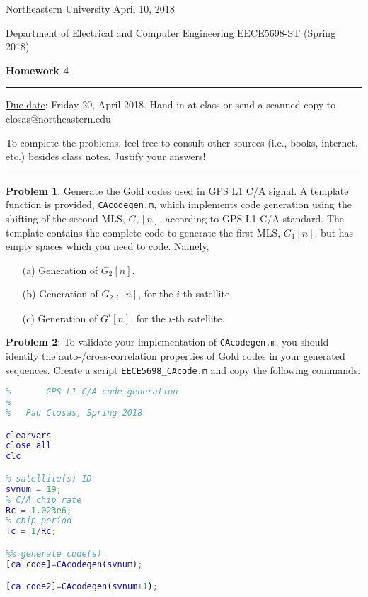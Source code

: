 \documentclass[11pt]{article}
\begin{document}
\noindent Northeastern University
\hfill April 10, 2018

\noindent Department of Electrical and Computer Engineering
\hfill EECE5698-ST (Spring 2018)

\noindent {} \hfill \textbf{Homework 4}

\noindent \rule{\linewidth}{1.5pt}

\vspace*{.5cm}

\underline{Due date}: Friday 20, April 2018. Hand in at class or send a scanned copy to closas@northeastern.edu

To complete the problems, feel free to consult other sources (i.e., books, internet, etc.) besides class notes.  Justify your answers!

\noindent \rule{\linewidth}{1pt}
\vspace*{1cm}


\textbf{Problem 1}:
Generate the Gold codes used in GPS L1 C/A signal. A template function is provided, \verb|CAcodegen.m|, which implements code generation using the shifting of the second MLS, $G_2[n]$, according to GPS L1 C/A standard.
The template contains the complete code to generate the first MLS, $G_1[n]$, but has empty spaces which you need to code. Namely,
\begin{enumerate}
\item[(a)] Generation of $G_2[n]$.
\item[(b)] Generation of $G_{2,i}[n]$, for the $i$-th satellite.
\item[(c)] Generation of $G^{i}[n]$, for the $i$-th satellite.
\end{enumerate}


\vspace*{.5cm}

\textbf{Problem 2}:
To validate your implementation of \verb|CAcodegen.m|, you should identify the auto-/cross-correlation properties of Gold codes in your generated sequences. 
Create a script \verb|EECE5698_CAcode.m| and copy the following commands:

\begin{lstlisting}[language=Matlab,basicstyle=\scriptsize,keywordstyle=\color{blue}, commentstyle=\color{green},frame=single]
%   EECE5698-ST: GNSS signal processing
%       GPS L1 C/A code generation
%
%   Pau Closas, Spring 2018

clearvars
close all
clc

% satellite(s) ID
svnum = 19;
% C/A chip rate
Rc = 1.023e6;
% chip period
Tc = 1/Rc;

%% generate code(s)
[ca_code]=CAcodegen(svnum);

[ca_code2]=CAcodegen(svnum+1);
\end{lstlisting}
\end{document}
